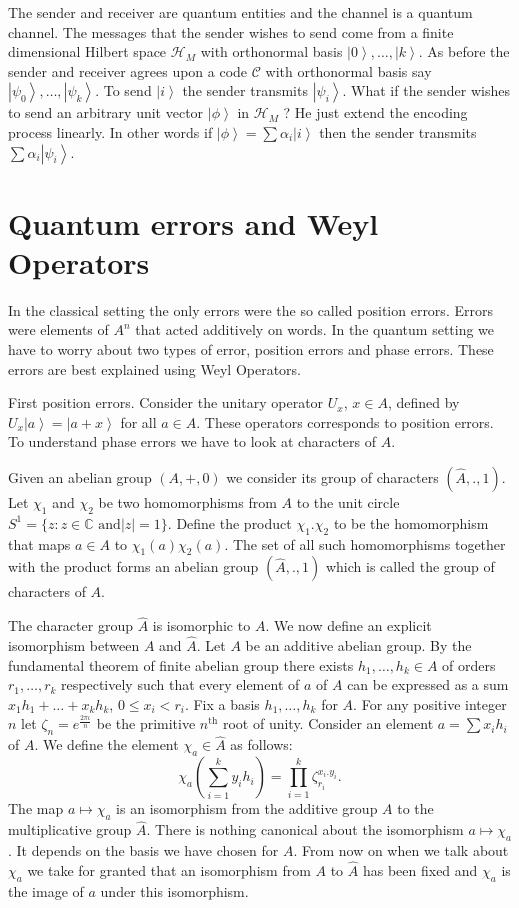 \documentclass[11pt,twoside]{article}
\theoremstyle{definition}
\theoremstyle{remark}
\newcommand{\ket}[1]{\ensuremath{\left\vert #1 \right\rangle}}
\begin{document}
The sender and receiver are quantum entities and the channel is a
quantum channel. The messages that the sender wishes to send come from
a finite dimensional Hilbert space $\mathcal{H}_M$ with orthonormal
basis $\ket{0},\ldots,\ket{k}$. As before the sender and receiver
agrees upon a code $\mathcal{C}$ with orthonormal basis say
$\ket{\psi_0},\ldots,\ket{\psi_k}$. To send $\ket{i}$ the sender
transmits $\ket{\psi_i}$. What if the sender wishes to send an
arbitrary unit vector $\ket{\phi}$ in $\mathcal{H}_M$ ? He just extend
the encoding process linearly. In other words if $\ket{\phi} = \sum
\alpha_i \ket{i}$ then the sender transmits $\sum \alpha_i
\ket{\psi_i}$.

\section{Quantum errors and Weyl Operators}

In the classical setting the only errors were the so called position
errors. Errors were elements of $A^n$ that acted additively on words.
In the quantum setting we have to worry about two types of error,
position errors and phase errors.  These errors are best explained
using Weyl Operators.

First position errors. Consider the unitary operator $U_x$, $x\in
A$, defined by $U_x \ket{a} = \ket{a + x}$ for all $a \in A$. These
operators corresponds to position errors.  To understand phase errors
we have to look at characters of $A$.

Given an abelian group $(A,+,0)$ we consider its group of characters
$(\hat{A},.,1)$. Let $\chi_1$ and $\chi_2$ be two homomorphisms from
$A$ to the unit circle $S^1 = \{ z : z \in \mathbb{C} \textrm{ and
}|z| = 1 \}$. Define the product $\chi_1 . \chi_2$ to be the
homomorphism that maps $a \in A$ to $\chi_1(a) \chi_2(a)$. The set of
all such homomorphisms together with the product forms an abelian
group $(\hat{A},.,1)$ which is called the group of characters of $A$.

The character group $\hat{A}$ is isomorphic to $A$. We now define an
explicit isomorphism between $A$ and $\hat{A}$.  Let $A$ be an
additive abelian group. By the fundamental theorem of finite abelian
group there exists $h_1,\ldots,h_k \in A$ of orders $r_1,\ldots,r_k$
respectively such that every element of $a$ of $A$ can be expressed as
a sum $x_1 h_1 + \ldots + x_k h_k$, $0 \leq x_i < r_i$. Fix a basis
$h_1,\ldots, h_k$ for $A$. For any positive integer $n$ let $\zeta_n =
e^{\frac{2\pi\iota}{n}}$ be the primitive $n^{\mathrm{th}}$ root of
unity.  Consider an element $a = \sum x_i h_i$ of $A$. We define the
element $\chi_a \in \hat{A}$ as follows:
\[
\chi_a \left(\sum_{i=1}^k y_i h_i \right) = \prod_{i=1}^k
\zeta_{r_i}^{x_i . y_i}.
\]
The map $a \mapsto \chi_a$ is an isomorphism from the additive group
$A$ to the multiplicative group $\hat{A}$. There is nothing canonical
about the isomorphism $a \mapsto \chi_a$. It depends on the basis we
have chosen for $A$. {From} now on when we talk about $\chi_a$ we
take for granted that an isomorphism {from} $A$ to $\hat{A}$ has been
fixed and $\chi_a$ is the image of $a$ under this isomorphism. 
\end{document}

